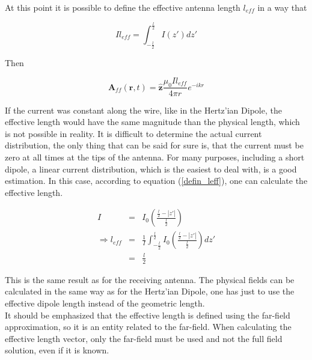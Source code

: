 \documentclass[a4paper,11pt]{report}
\begin{document}
At this point it is possible to define the effective antenna length $l_{eff}$ in a way that

\begin{equation}\label{defin_leff}
Il_{eff}= \int_{-\frac{l}{2}}^{\frac{l}{2}} I(z') dz'
\end{equation}

Then

\begin{equation}\label{shd_A_solution}
\mathbf{A}_{ff}(\mathbf{r},t) = \mathbf{\hat{z}} \frac{\mu_0 I l_{eff}}{4 \pi r} e^{-ikr}
\end{equation}

If the current was constant along the wire, like in the Hertz'ian Dipole, the effective length would have the same magnitude than the physical length, which is not possible in reality. It is difficult to determine the actual current distribution, the only thing that can be said for sure is, that the current must be zero at all times at the tips of the antenna. For many purposes, including a short dipole, a linear current distribution, which is the easiest to deal with, is a good estimation. In this case, according to equation (\ref{defin_leff}), one can calculate the effective length.


\begin{eqnarray}
I&=&I_0 \left( \frac{\frac{l}{2}-|z'|}{\frac{l}{2}}\right) \label{l_eff_shd_1} \\
\Rightarrow  l_{eff}&=& \frac{1}{I} \int_{-\frac{l}{2}}^{\frac{l}{2}} I_0 \left( \frac{\frac{l}{2}-|z'|}{\frac{l}{2}}\right) dz' \label{l_eff_shd_2} \\
&=&\frac{l}{2} \nonumber
\end{eqnarray}

This is the same result as for the receiving antenna. The physical fields can be calculated in the same way as for the Hertz'ian Dipole, one has just to use the effective dipole length instead of the geometric length.\\

It should be emphasized that the effective length is defined using the far-field approximation, so it is an entity related to the far-field. When calculating the effective length vector, only the far-field must be used and not the full field solution, even if it is known.\\
\end{document}
